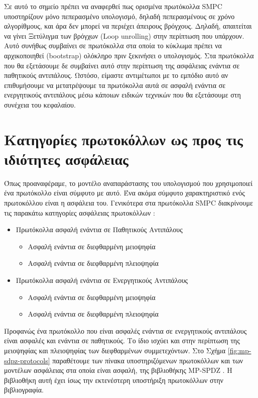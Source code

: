 Σε αυτό το σημείο πρέπει να αναφερθεί πως ορισμένα πρωτόκολλα SMPC υποστηρίζουν μόνο πεπερασμένο υπολογισμό, δηλαδή πεπερασμένους σε χρόνο αλγορίθμους, και άρα δεν μπορεί να περιέχει άπειρους βρόγχους. Δηλαδή, απαιτείται να γίνει Ξετύλιγμα των βρόγχων (Loop unrolling) στην περίπτωση που υπάρχουν. Αυτό συνήθως συμβαίνει σε πρωτόκολλα στα οποία το κύκλωμα πρέπει να αρχικοποιηθεί (bootstrap) ολόκληρο πριν ξεκινήσει ο υπολογισμός. Στα πρωτόκολλα που θα εξετάσουμε δε συμβαίνει αυτό στην περίπτωση της ασφάλειας ενάντια σε παθητικούς αντιπάλους. Ωστόσο, είμαστε αντιμέτωποι με το εμπόδιο αυτό αν επιθυμήσουμε να μετατρέψουμε τα πρωτόκολλα αυτά σε ασφαλή ενάντια σε ενεργητικούς αντιπάλους μέσω κάποιων ειδικών τεχνικών που θα εξετάσουμε στη συνέχεια του κεφαλαίου.

\section{Κατηγορίες πρωτοκόλλων ως προς τις ιδιότητες ασφάλειας}

Όπως προαναφέραμε, το μοντέλο αναπαράστασης του υπολογισμού που χρησιμοποιεί ένα πρωτόκολλο είναι σύμφυτο με αυτό. Ένα ακόμα σύμφυτο χαρακτηριστικό ενός πρωτοκόλλου είναι η ασφάλεια του. Γενικότερα στα πρωτόκολλα SMPC διακρίνουμε τις παρακάτω κατηγορίες ασφάλειας πρωτοκόλλων :

\begin{itemize}
    \item Πρωτόκολλα ασφαλή ενάντια σε Παθητικούς Αντιπάλους
        \begin{itemize}
            \item Ασφαλή ενάντια σε διεφθαρμένη μειοψηφία
            \item Ασφαλή ενάντια σε διεφθαρμένη πλειοψηφία
        \end{itemize}
    \item Πρωτόκολλα ασφαλή ενάντια σε Ενεργητικούς Αντιπάλους
        \begin{itemize}
            \item Ασφαλή ενάντια σε διεφθαρμένη μειοψηφία
            \item Ασφαλή ενάντια σε διεφθαρμένη πλειοψηφία
        \end{itemize}
\end{itemize}

Προφανώς ένα πρωτόκολλο που είναι ασφαλές ενάντια σε ενεργητικούς αντιπάλους είναι ασφαλές και ενάντια σε παθητικούς. Το ίδιο ισχύει και στην περίπτωση της μειοψηφίας και πλειοψηφίας των διεφθαρμένων συμμετεχόντων. Στο Σχήμα \ref{fig:mp-sdpz-protocols} παραθέτουμε των πίνακα υποστηριζόμενων πρωτοκόλλων και των μοντέλων ασφάλειας στα οποία είναι ασφαλή, της βιβλιοθήκης MP-SPDZ \cite{mp-spdz}. Η βιβλιοθήκη αυτή έχει ίσως την εκτενέστερη υποστήριξη πρωτοκόλλων στην βιβλιογραφία.


